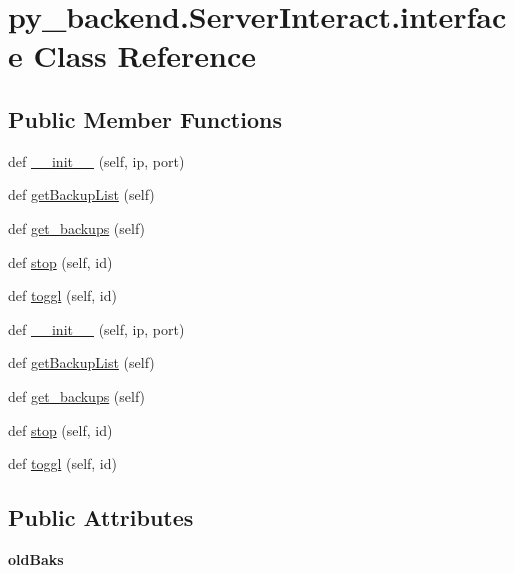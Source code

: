 \hypertarget{classpy__backend_1_1ServerInteract_1_1interface}{}\section{py\+\_\+backend.\+Server\+Interact.\+interface Class Reference}
\label{classpy__backend_1_1ServerInteract_1_1interface}
\subsection*{Public Member Functions}
\begin{DoxyCompactItemize}
\item 
def \hyperlink{classpy__backend_1_1ServerInteract_1_1interface_a23c925529e15f6826f72220bbc93fb41}{\+\_\+\+\_\+init\+\_\+\+\_\+} (self, ip, port)
\item 
def \hyperlink{classpy__backend_1_1ServerInteract_1_1interface_a910377517d1791892c4a678c41e731ad}{get\+Backup\+List} (self)
\item 
def \hyperlink{classpy__backend_1_1ServerInteract_1_1interface_a48393572c1bb46d6f6f30238ecdcd44d}{get\+\_\+backups} (self)
\item 
def \hyperlink{classpy__backend_1_1ServerInteract_1_1interface_aaca002b0517d2ad001bd5cf139e97921}{stop} (self, id)
\item 
def \hyperlink{classpy__backend_1_1ServerInteract_1_1interface_a691474250a3e2b1dc34b102866b6b9d4}{toggl} (self, id)
\item 
def \hyperlink{classpy__backend_1_1ServerInteract_1_1interface_a23c925529e15f6826f72220bbc93fb41}{\+\_\+\+\_\+init\+\_\+\+\_\+} (self, ip, port)
\item 
def \hyperlink{classpy__backend_1_1ServerInteract_1_1interface_a910377517d1791892c4a678c41e731ad}{get\+Backup\+List} (self)
\item 
def \hyperlink{classpy__backend_1_1ServerInteract_1_1interface_a48393572c1bb46d6f6f30238ecdcd44d}{get\+\_\+backups} (self)
\item 
def \hyperlink{classpy__backend_1_1ServerInteract_1_1interface_aaca002b0517d2ad001bd5cf139e97921}{stop} (self, id)
\item 
def \hyperlink{classpy__backend_1_1ServerInteract_1_1interface_a691474250a3e2b1dc34b102866b6b9d4}{toggl} (self, id)
\end{DoxyCompactItemize}
\subsection*{Public Attributes}
\begin{DoxyCompactItemize}
\item 
{\bfseries old\+Baks}\hypertarget{classpy__backend_1_1ServerInteract_1_1interface_a2c34b4fc6674648d0c4e93cd5256e34f}{}\label{classpy__backend_1_1ServerInteract_1_1interface_a2c34b4fc6674648d0c4e93cd5256e34f}

\end{DoxyCompactItemize}
